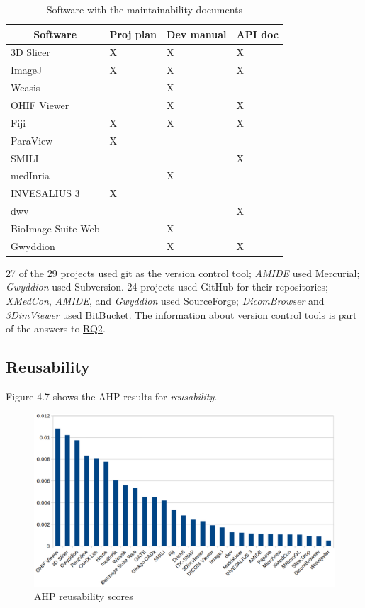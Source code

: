 \documentclass[3p, 12pt,authoryear]{elsarticle}
\begin{document}
\begin{table}[ht]
\centering
\begin{tabular}{llll}
\hline
\multicolumn{1}{c}{Software} & Proj plan & Dev manual & API doc \\ \hline
3D Slicer & X & X & X \\
ImageJ & X & X & X \\
Weasis &  & X &  \\
OHIF Viewer &  & X & X \\
Fiji & X & X & X \\
ParaView & X &  &  \\
SMILI &  &  & X \\
medInria &  & X &  \\
INVESALIUS 3 & X &  &  \\
dwv &  &  & X \\
BioImage Suite Web &  & X &  \\
Gwyddion &  & X & X \\ \hline
\end{tabular}
\caption{\label{tab_maintainability_docs}Software with the maintainability documents}
\end{table}

27 of the 29 projects used git as the version control tool; \textit{AMIDE} used
Mercurial; \textit{Gwyddion} used Subversion. 24 projects used GitHub for their
repositories; \textit{XMedCon}, \textit{AMIDE}, and \textit{Gwyddion} used
SourceForge; \textit{DicomBrowser} and \textit{3DimViewer} used BitBucket. The
information about version control tools is part of the answers to
\hyperlink{rq2}{RQ2}.

\subsection{Reusability} \label{sec_result_reusability}

Figure 4.7 shows the AHP results for \textit{reusability}.

\begin{figure}[ht]
\includegraphics[scale=0.38]{figures/reusability_scores.png}
\caption{AHP reusability scores}
\label{fg_reusability_scores}
\end{figure}
\end{document}
